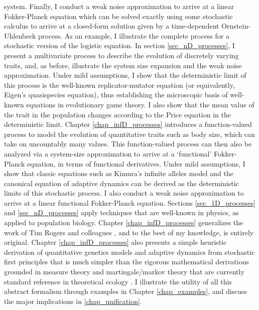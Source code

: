 system. Finally, I conduct a weak noise approximation to arrive at a linear Fokker-Planck equation which can be solved exactly using some stochastic calculus to arrive at a closed-form solution given by a time-dependent Ornstein-Uhlenbeck process. As an example, I illustrate the complete process for a stochastic version of the logistic equation. In section \ref{sec_nD_processes}, I present a multivariate process to describe the evolution of discretely varying traits, and, as before, illustrate the system size expansion and the weak noise approximation. Under mild assumptions, I show that the deterministic limit of this process is the well-known replicator-mutator equation (or equivalently, Eigen's quasispecies equation), thus establishing the microscopic basis of well-known equations in evolutionary game theory. I also show that the mean value of the trait in the population changes according to the Price equation in the deterministic limit. Chapter \ref{chap_infD_processes} introduces a function-valued process to model the evolution of quantitative traits such as body size, which can take on uncountably many values. This function-valued process can then also be analyzed via a system-size approximation to arrive at a `functional' Fokker-Planck equation, in terms of functional derivatives. Under mild assumptions, I show that classic equations such as Kimura's infinite alleles model and the canonical equation of adaptive dynamics can be derived as the deterministic limits of this stochastic process. I also conduct a weak noise approximation to arrive at a linear functional Fokker-Planck equation.  Sections \ref{sec_1D_processes} and \ref{sec_nD_processes} apply techniques that are well-known in physics, as applied to population biology. Chapter \ref{chap_infD_processes} generalizes the work of Tim Rogers and colleagues \citep{rogers_demographic_2012,rogers_spontaneous_2012,rogers_modes_2015}, and to the best of my knowledge, is entirely original. Chapter \ref{chap_infD_processes} also presents a simple heuristic derivation of quantitative genetics models and adaptive dynamics from stochastic first principles that is much simpler than the rigorous mathematical derivations grounded in measure theory and martingale/markov theory that are currently standard reference in theoretical ecology \citep{champagnat_individual_2008}. I illustrate the utility of all this abstract formalism through examples in Chapter \ref{chap_examples}, and discuss the major implications in \ref{chap_unification}.

